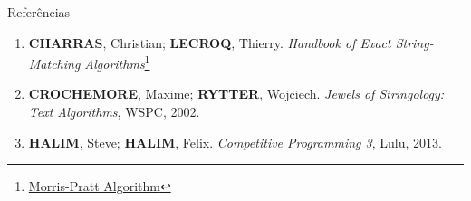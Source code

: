 \begin{frame}[fragile]{Referências}

    \begin{enumerate}
        \item \textbf{CHARRAS}, Christian; \textbf{LECROQ}, Thierry. \textit{Handbook of Exact String-Matching Algorithms}\footnote{\href{http://www-igm.univ-mlv.fr/~lecroq/string/node7.html}{Morris-Pratt Algorithm}}

        \item \textbf{CROCHEMORE}, Maxime; \textbf{RYTTER}, Wojciech. \textit{Jewels of Stringology: Text Algorithms}, WSPC, 2002.

        \item \textbf{HALIM}, Steve; \textbf{HALIM}, Felix. \textit{Competitive Programming 3}, Lulu, 2013.
    \end{enumerate}

\end{frame}
